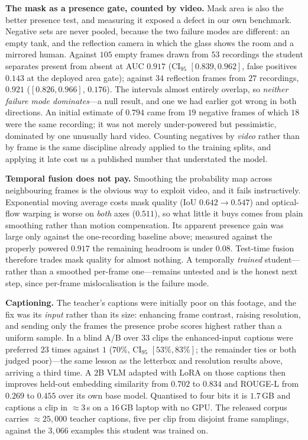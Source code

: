 \documentclass[conference]{IEEEtran}
\begin{document}
\textbf{The mask as a presence gate, counted by video.} Mask area is also the
better presence test, and measuring it exposed a defect in our own benchmark.
Negative sets are never pooled, because the two failure modes are different: an
empty tank, and the reflection camera in which the glass shows the room and a
mirrored human. Against $105$ empty frames drawn from $53$ recordings the
student separates present from absent at AUC $0.917$
(CI$_{95}$ $[0.839,0.962]$, false positives $0.143$ at the deployed area gate);
against $34$ reflection frames from $27$ recordings, $0.921$
($[0.826,0.966]$, $0.176$). The intervals almost entirely overlap, so
\emph{neither failure mode dominates}---a null result, and one we had earlier
got wrong in both directions. An initial estimate of $0.794$ came from $19$
negative frames of which $18$ were the same recording; it was not merely
under-powered but pessimistic, dominated by one unusually hard video. Counting
negatives by \emph{video} rather than by frame is the same discipline already
applied to the training splits, and applying it late cost us a published number
that understated the model.

\textbf{Temporal fusion does not pay.} Smoothing the probability map across
neighbouring frames is the obvious way to exploit video, and it fails
instructively. Exponential moving average costs mask quality
(IoU $0.642\rightarrow0.547$) and optical-flow warping is worse on \emph{both}
axes ($0.511$), so what little it buys comes from plain smoothing rather than
motion compensation. Its apparent presence gain was large only against the
one-recording baseline above; measured against the properly powered $0.917$ the
remaining headroom is under $0.08$. Test-time fusion therefore trades mask
quality for almost nothing. A temporally \emph{trained} student---rather than a
smoothed per-frame one---remains untested and is the honest next step, since
per-frame mislocalisation is the failure mode.

\textbf{Captioning.} The teacher's captions were initially poor on this footage,
and the fix was its \emph{input} rather than its size: enhancing frame contrast,
raising resolution, and sending only the frames the presence probe scores highest
rather than a uniform sample. In a blind A/B over $33$ clips the enhanced-input
captions were preferred $23$ times against $1$ ($70\%$, CI$_{95}$ $[53\%,83\%]$;
the remainder ties or both judged poor)---the same lesson as the letterbox and
resolution results above, arriving a third time. A $2$B VLM adapted with LoRA on
those captions then improves held-out embedding similarity from $0.702$ to
$0.834$ and ROUGE-L from $0.269$ to $0.455$ over its own base model. Quantised to
four bits it is $1.7$\,GB and captions a clip in ${\approx}3$\,s on a $16$\,GB
laptop with no GPU. The released corpus carries ${\approx}25{,}000$ teacher
captions, five per clip from disjoint frame samplings, against the $3{,}066$
examples this student was trained on.
\end{document}
